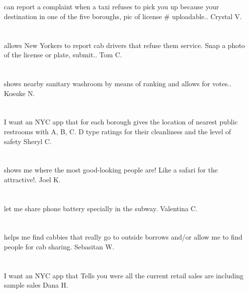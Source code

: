 \section{}can report a complaint when a taxi refuses to pick you up because your destination in one of the five boroughs,  pic of license \# uploadable.. Crystal  V.
\section{}allows New Yorkers to report cab drivers that refuse them service. Snap a photo of the license or plate,  submit.. Tom C.
\section{}shows nearby sanitary washroom by means of ranking and allows for votes.. Kosuke N.
\section{} I want an NYC app that for each borough gives the location of nearest public restrooms with A,  B,  C.  D type ratings for their cleanliness and the level of safety     Sheryl C.
\section{}shows me where the most good-looking people are! Like a safari for the attractive!. Joel K.
\section{}let me share phone battery specially in the subway. Valentina C.
\section{}helps me find cabbies that really go to outside borrows and/or allow me to find people for cab sharing. Sebasitan W.
\section{} I want an NYC app that Tells you were all the current retail sales are including sample sales  Dana H.
